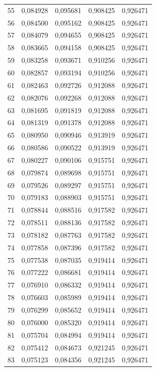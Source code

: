 \begin{tabular}{lrrrr}
55 & 0,084928 & 0,095681 & 0,908425 & 0,926471 \\
56 & 0,084500 & 0,095162 & 0,908425 & 0,926471 \\
57 & 0,084079 & 0,094655 & 0,908425 & 0,926471 \\
58 & 0,083665 & 0,094158 & 0,908425 & 0,926471 \\
59 & 0,083258 & 0,093671 & 0,910256 & 0,926471 \\
60 & 0,082857 & 0,093194 & 0,910256 & 0,926471 \\
61 & 0,082463 & 0,092726 & 0,912088 & 0,926471 \\
62 & 0,082076 & 0,092268 & 0,912088 & 0,926471 \\
63 & 0,081695 & 0,091819 & 0,912088 & 0,926471 \\
64 & 0,081319 & 0,091378 & 0,912088 & 0,926471 \\
65 & 0,080950 & 0,090946 & 0,913919 & 0,926471 \\
66 & 0,080586 & 0,090522 & 0,913919 & 0,926471 \\
67 & 0,080227 & 0,090106 & 0,915751 & 0,926471 \\
68 & 0,079874 & 0,089698 & 0,915751 & 0,926471 \\
69 & 0,079526 & 0,089297 & 0,915751 & 0,926471 \\
70 & 0,079183 & 0,088903 & 0,915751 & 0,926471 \\
71 & 0,078844 & 0,088516 & 0,917582 & 0,926471 \\
72 & 0,078511 & 0,088136 & 0,917582 & 0,926471 \\
73 & 0,078182 & 0,087763 & 0,917582 & 0,926471 \\
74 & 0,077858 & 0,087396 & 0,917582 & 0,926471 \\
75 & 0,077538 & 0,087035 & 0,919414 & 0,926471 \\
76 & 0,077222 & 0,086681 & 0,919414 & 0,926471 \\
77 & 0,076910 & 0,086332 & 0,919414 & 0,926471 \\
78 & 0,076603 & 0,085989 & 0,919414 & 0,926471 \\
79 & 0,076299 & 0,085652 & 0,919414 & 0,926471 \\
80 & 0,076000 & 0,085320 & 0,919414 & 0,926471 \\
81 & 0,075704 & 0,084994 & 0,919414 & 0,926471 \\
82 & 0,075412 & 0,084673 & 0,921245 & 0,926471 \\
83 & 0,075123 & 0,084356 & 0,921245 & 0,926471 \\

\end{tabular}
